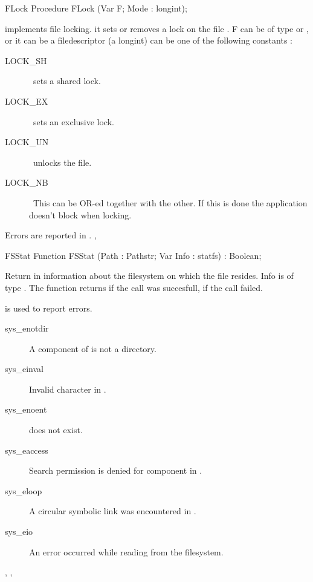 \html{}
\begin{procedure}{FLock}
\Declaration
Procedure FLock (Var F; Mode : longint);

\Description
{} implements file locking. it sets or removes a lock on the file
. F can be of type  or , or it can be a \linux
filedescriptor (a longint)
 can be one of the following constants :
\begin{description}
\item [LOCK\_SH] \ sets a shared lock.
\item [LOCK\_EX] \ sets an exclusive lock.
\item [LOCK\_UN] \ unlocks the file.
\item [LOCK\_NB] \ This can be OR-ed together with the other. If this is done
the application doesn't block when locking.
\end{description}

\Errors
Errors are reported in .
\SeeAlso
{}, 
\end{procedure}
\begin{function}{FSStat}
\Declaration
Function FSStat (Path : Pathstr; Var Info : statfs) : Boolean;

\Description
 Return in  information about the filesystem on which the file
 resides. Info is of type .
The function returns  if the call was succesfull,  if the call
failed.

\Errors
  is used to report errors.
\begin{description}
\item[sys\_enotdir] A component of  is not a directory.
\item[sys\_einval] Invalid character in .
\item[sys\_enoent]  does not exist.
\item[sys\_eaccess] Search permission is denied for  component in
.
\item[sys\_eloop] A circular symbolic link was encountered in .
\item[sys\_eio] An error occurred while reading from the filesystem.
\end{description}

\SeeAlso
{}, , 
\end{function}
